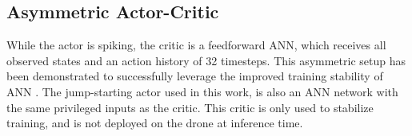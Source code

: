 \subsection{Asymmetric Actor-Critic}
While the actor is spiking,  the critic is a feedforward ANN, which receives all observed states and an action history of 32 timesteps. This asymmetric setup has been demonstrated to successfully leverage the improved training stability of ANN \cite{Tang2020, Tang2020_Hardware}. The jump-starting actor used in this work, is also an ANN network with the same privileged inputs as the critic. 
This critic is only used to stabilize training, and is not deployed on the drone at inference time.

